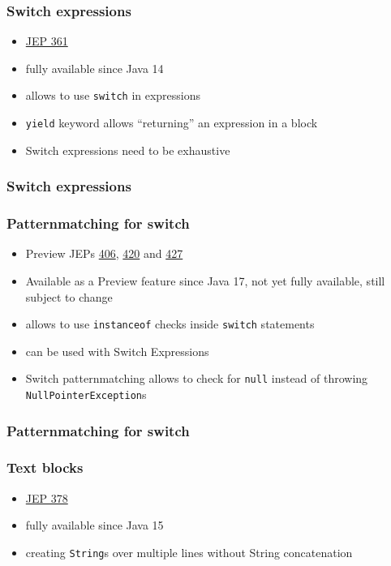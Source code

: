 \documentclass{beamer}
\begin{document}
\begin{frame}
\frametitle{Switch expressions}
\begin{itemize}
  \item \href{https://openjdk.org/jeps/361}{JEP 361}
  \item fully available since Java 14
  \pause
  \item allows to use \texttt{switch} in expressions
  \item \texttt{yield} keyword allows ``returning'' an expression in a block
  \item Switch expressions need to be exhaustive
\end{itemize}
\end{frame}
\begin{frame}
\frametitle{Switch expressions}

\end{frame}

\begin{frame}
\frametitle{Patternmatching for switch}
\begin{itemize}
  \item Preview JEPs \href{https://openjdk.org/jeps/406}{406}, \href{https://openjdk.org/jeps/420}{420} and \href{https://openjdk.org/jeps/427}{427}
  \item Available as a Preview feature since Java 17, not yet fully available, still subject to change
  \pause
  \item allows to use \texttt{instanceof} checks inside \texttt{switch} statements
  \item can be used with Switch Expressions
  \item Switch patternmatching allows to check for \texttt{null} instead of throwing \texttt{NullPointerException}s
\end{itemize}
\end{frame}
\begin{frame}
\frametitle{Patternmatching for switch}

\end{frame}

\begin{frame}
\frametitle{Text blocks}
\begin{itemize}
  \item \href{https://openjdk.org/jeps/378}{JEP 378}
  \item fully available since Java 15
  \pause
  \item creating \texttt{String}s over multiple lines without String concatenation
\end{itemize}
\pause

\end{frame}
\end{document}
